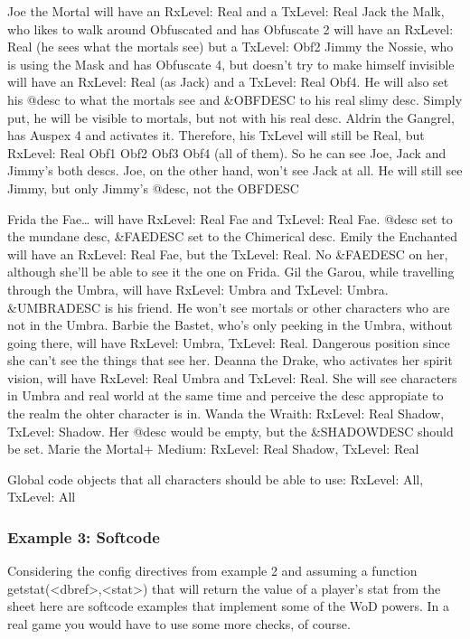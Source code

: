 \documentclass[letterpaper,10pt,english]{sphinxmanual}
\begin{document}
\sphinxAtStartPar
Joe the Mortal will have an RxLevel: Real and a TxLevel: Real
Jack the Malk, who likes to walk around Obfuscated and has Obfuscate 2 will
have an RxLevel: Real (he sees what the mortals see) but a TxLevel: Obf2
Jimmy the Nossie, who is using the Mask and has Obfuscate 4, but doesn’t
try to make himself invisible will have an RxLevel: Real (as Jack)
and a TxLevel: Real Obf4. He will also set his @desc to what the mortals see and
\&OBFDESC to his real slimy desc. Simply put, he will be visible to mortals,
but not with his real desc.
Aldrin the Gangrel, has Auspex 4 and activates it. Therefore, his TxLevel
will still be Real, but RxLevel: Real Obf1 Obf2 Obf3 Obf4 (all of them). So
he can see Joe, Jack and Jimmy’s both descs.
Joe, on the other hand, won’t see Jack at all. He will still see Jimmy, but
only Jimmy’s @desc, not the OBFDESC

\sphinxAtStartPar
Frida the Fae… will have RxLevel: Real Fae and TxLevel: Real Fae. @desc
set to the mundane desc, \&FAEDESC set to the Chimerical desc.
Emily the Enchanted will have an RxLevel: Real Fae, but the TxLevel: Real.
No \&FAEDESC on her, although she’ll be able to see it the one on Frida.
Gil the Garou, while travelling through the Umbra, will have RxLevel: Umbra
and TxLevel: Umbra. \&UMBRADESC is his friend. He won’t see mortals or other
characters who are not in the Umbra.
Barbie the Bastet, who’s only peeking in the Umbra, without going there,
will have RxLevel: Umbra, TxLevel: Real. Dangerous position since she
can’t see the things that see her.
Deanna the Drake, who activates her spirit vision, will have
RxLevel: Real Umbra and TxLevel: Real. She will see characters in Umbra and
real world at the same time and perceive the desc appropiate to the realm
the ohter character is in.
Wanda the Wraith: RxLevel: Real Shadow, TxLevel: Shadow. Her @desc
would be empty, but the \&SHADOWDESC should be set.
Marie the Mortal+ Medium: RxLevel: Real Shadow, TxLevel: Real

\sphinxAtStartPar
Global code objects that all characters should be able to use:
RxLevel: All, TxLevel: All


\subsubsection{Example 3: Softcode}
\label{\detokenize{advanced:example-3-softcode}}
\sphinxAtStartPar
Considering the config directives from example 2 and assuming a function
getstat(\textless{}dbref\textgreater{},\textless{}stat\textgreater{}) that will return the value of a player’s stat from
the sheet here are softcode examples that implement some of the WoD powers.
In a real game you would have to use some more checks, of course.
\end{document}

